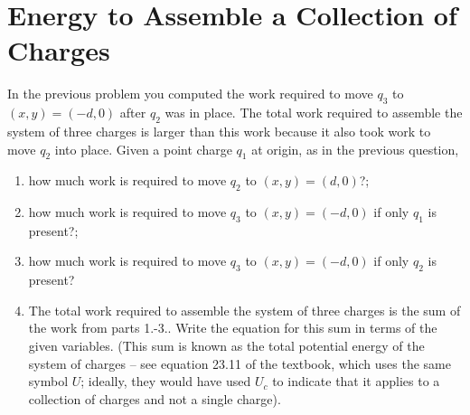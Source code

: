 \documentclass{article}
\begin{document}
\section{Energy to Assemble a Collection of Charges}

In the previous problem you computed the work required to move $q_3$ to $(x,y) = (-d,0)$ after $q_2$ was in place. The total work required to assemble the system of three charges is larger than this work because it also took work to move $q_2$ into place. Given a point charge $q_1$ at origin, as in the previous question,

\begin{enumerate}

  \item how much work is required to move $q_2$ to $(x,y) = (d,0)$?;

        \ifsolutions
          
        \fi
        \ifsolutions\else
        
        \vskip 36.135pt
        \fi

  \item how much work is required to move $q_3$ to $(x,y) = (-d,0)$ if only $q_1$ is present?;

        \ifsolutions
          
        \fi
        \ifsolutions\else
        
        \vskip 36.135pt
        \fi

  \item how much work is required to move $q_3$ to $(x,y) = (-d,0)$ if only $q_2$ is present?

        \ifsolutions
          
        \fi
        \ifsolutions\else
        
        \vskip 36.135pt
        \fi

  \item The total work required to assemble the system of three charges is the sum of the work from parts 1.-3.. Write the equation for this sum in terms of the given variables. (This sum is known as the total potential energy of the system of charges -- see equation 23.11 of the textbook, which uses the same symbol $U$; ideally, they would have used $U_c$ to indicate that it applies to a collection of charges and not a single charge).

\end{enumerate}
\end{document}
